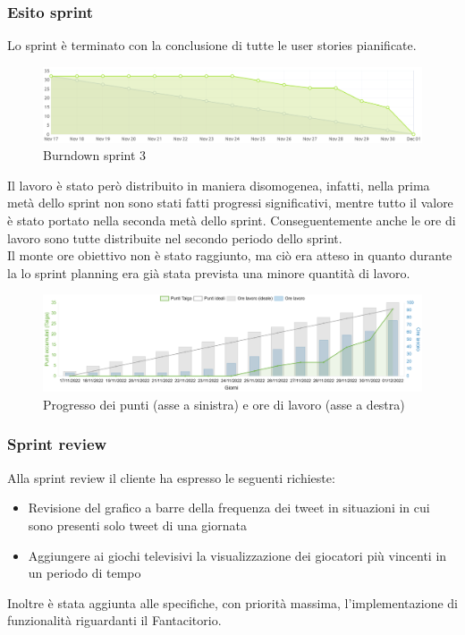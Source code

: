 \newpage
\subsubsection{Esito sprint}
Lo sprint è terminato con la conclusione di tutte le user stories pianificate.\\
\begin{figure}[H]
    \centering
    \includegraphics[width=15cm]{./img/sprint3/burndown.png}
    \caption{Burndown sprint 3}
\end{figure}
Il lavoro è stato però distribuito in maniera disomogenea, infatti, nella prima metà dello sprint non sono stati fatti progressi significativi,
mentre tutto il valore è stato portato nella seconda metà dello sprint. 
Conseguentemente anche le ore di lavoro sono tutte distribuite nel secondo periodo dello sprint.\\
Il monte ore obiettivo non è stato raggiunto, ma ciò era atteso in quanto durante la lo sprint planning era già stata prevista una minore quantità di lavoro.
\begin{figure}[H]
    \centering
    \includegraphics[width=15cm]{./img/sprint3/worktime.png}
    \caption{Progresso dei punti (asse a sinistra) e ore di lavoro (asse a destra)}
\end{figure}


\subsubsection{Sprint review}
Alla sprint review il cliente ha espresso le seguenti richieste:
\begin{itemize}
    \item Revisione del grafico a barre della frequenza dei tweet in situazioni in cui sono presenti solo tweet di una giornata
    \item Aggiungere ai giochi televisivi la visualizzazione dei giocatori più vincenti in un periodo di tempo
\end{itemize} 
Inoltre è stata aggiunta alle specifiche, con priorità massima, l'implementazione di funzionalità riguardanti il Fantacitorio.


